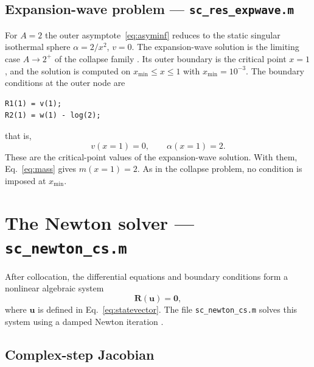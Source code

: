 \documentclass[11pt,a4paper]{article}
\begin{document}
\subsection{Expansion-wave problem --- \texttt{sc\_res\_expwave.m}}

For $A=2$ the outer asymptote~\eqref{eq:asyminf} reduces to the static
singular isothermal sphere $\alpha=2/x^2$, $v=0$. The expansion-wave
solution is the limiting case $A\rightarrow2^+$ of the collapse family
\cite{shu1977}. Its outer boundary is the critical point $x=1$, and the
solution is computed on $x_{\min}\le x\le1$ with $x_{\min}=10^{-3}$. The
boundary conditions at the outer node are
\begin{lstlisting}[style=matlab]
R1(1) = v(1);
R2(1) = w(1) - log(2);
\end{lstlisting}
that is,
\begin{equation}
v(x{=}1)=0,
\qquad
\alpha(x{=}1)=2.
\label{eq:criticalBC}
\end{equation}
These are the critical-point values of the expansion-wave solution. With
them, Eq.~\eqref{eq:mass} gives $m(x{=}1)=2$. As in the collapse
problem, no condition is imposed at $x_{\min}$.

\section{The Newton solver --- \texttt{sc\_newton\_cs.m}}
\label{sec:newton}

After collocation, the differential equations and boundary conditions
form a nonlinear algebraic system
\begin{equation}
\mathbf R(\mathbf u)=\mathbf 0,
\end{equation}
where $\mathbf u$ is defined in Eq.~\eqref{eq:statevector}. The file
\texttt{sc\_newton\_cs.m} solves this system using a damped Newton
iteration \cite{dennis1996}.

\subsection{Complex-step Jacobian}
\end{document}
